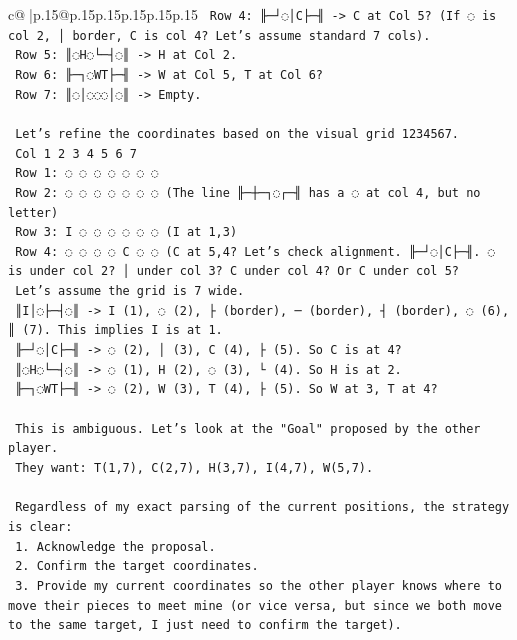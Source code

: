 \documentclass{article}
\begin{document}
{\begin{supertabular}{c@{$\;$}|p{.15\linewidth}@{}p{.15\linewidth}p{.15\linewidth}p{.15\linewidth}p{.15\linewidth}p{.15\linewidth}}
{{{\texttt{   Row 4: ╟─┘◌│C├─╢ {-}> C at Col 5? (If ◌ is col 2, │ border, C is col 4? Let's assume standard 7 cols).} \\
\texttt{   Row 5: ║◌H◌└─┤◌║ {-}> H at Col 2.} \\
\texttt{   Row 6: ╟─┐◌WT├─╢ {-}> W at Col 5, T at Col 6?} \\
\texttt{   Row 7: ║◌│◌◌◌│◌║ {-}> Empty.} \\
\\ 
\texttt{   Let's refine the coordinates based on the visual grid 1234567.} \\
\texttt{   Col 1 2 3 4 5 6 7} \\
\texttt{   Row 1: ◌ ◌ ◌ ◌ ◌ ◌ ◌} \\
\texttt{   Row 2: ◌ ◌ ◌ ◌ ◌ ◌ ◌ (The line ╟─┼─┐◌┌─╢ has a ◌ at col 4, but no letter)} \\
\texttt{   Row 3: I ◌ ◌ ◌ ◌ ◌ ◌ (I at 1,3)} \\
\texttt{   Row 4: ◌ ◌ ◌ ◌ C ◌ ◌ (C at 5,4? Let's check alignment. ╟─┘◌│C├─╢. ◌ is under col 2? │ under col 3? C under col 4? Or C under col 5?} \\
\texttt{   Let's assume the grid is 7 wide.} \\
\texttt{   ║I│◌├─┤◌║ {-}> I (1), ◌ (2), ├ (border), ─ (border), ┤ (border), ◌ (6), ║ (7). This implies I is at 1.} \\
\texttt{   ╟─┘◌│C├─╢ {-}> ◌ (2), │ (3), C (4), ├ (5). So C is at 4?} \\
\texttt{   ║◌H◌└─┤◌║ {-}> ◌ (1), H (2), ◌ (3), └ (4). So H is at 2.} \\
\texttt{   ╟─┐◌WT├─╢ {-}> ◌ (2), W (3), T (4), ├ (5). So W at 3, T at 4?} \\
\\ 
\texttt{   This is ambiguous. Let's look at the "Goal" proposed by the other player.} \\
\texttt{   They want: T(1,7), C(2,7), H(3,7), I(4,7), W(5,7).} \\
\\ 
\texttt{   Regardless of my exact parsing of the current positions, the strategy is clear:} \\
\texttt{   1. Acknowledge the proposal.} \\
\texttt{   2. Confirm the target coordinates.} \\
\texttt{   3. Provide my current coordinates so the other player knows where to move their pieces to meet mine (or vice versa, but since we both move to the same target, I just need to confirm the target).} \\
}}}
\end{supertabular}}
\end{document}
